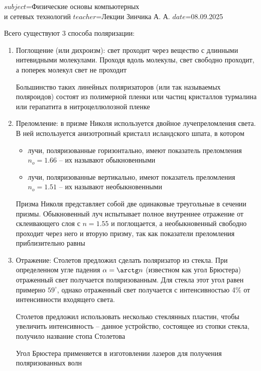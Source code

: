 $subject$=Физические основы компьютерных \\ и сетевых технологий
$teacher$=Лекции Зинчика А. А.
$date$=08.09.2025

Всего существуют 3 способа поляризации:

\begin{enumerate}
    \item Поглощение (или дихроизм): свет проходит через вещество с длинными нитевидными молекулами. Проходя вдоль молекулы, свет свободно проходит, а поперек молекул свет не проходит

    Большинство таких линейных поляризаторов (или так называемых поляроидов) состоят из полимерной пленки или частиц кристаллов турмалина или герапатита в нитроцеллюлозной пленке

    \item Преломление: в призме Николя используется двойное лучепреломления света. В ней используется анизотропный кристалл исландского шпата, в котором

    \begin{itemize}
        \item лучи, поляризованные горизонтально, имеют показатель преломления $n_o = 1.66$ -- их называют обыкновенными
        \item лучи, поляризованные вертикально, имеют показатель преломления $n_o = 1.51$ -- их называют необыкновенными
    \end{itemize}

    Призма Николя представляет собой две одинаковые треугольные в сечении призмы. Обыкновенный луч испытывает полное внутреннее отражение от склеивающего слоя с $n = 1.55$ и поглощается, а необыкновенный свободно проходит через него и вторую призму, так как показатели преломления приблизительно равны


    \item Отражение: Столетов предложил сделать поляризатор из стекла. При определенном угле падения $\alpha = \arctg n$ (известном как угол Брюстера) отраженный свет получается поляризованным. Для стекла этот угол равен примерно $59^{\circ}$, однако отраженный свет получается с интенсивностью 4\% от интенсивности входящего света.

    Столетов предложил использовать несколько стеклянных пластин, чтобы увеличить интенсивность -- данное устройство, состоящее из стопки стекла, получило название стопа Столетова

    Угол Брюстера применяется в изготовлении лазеров для получения поляризованных волн 

\end{enumerate}

